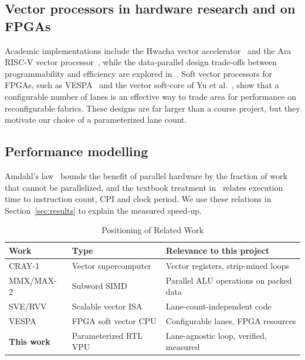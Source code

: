 \documentclass[conference]{IEEEtran}
\begin{document}
\subsection{Vector processors in hardware research and on FPGAs}
Academic implementations include the Hwacha vector accelerator~\cite{hwacha2014} and the Ara RISC-V vector processor~\cite{ara2020}, while the data-parallel design trade-offs between programmability and efficiency are explored in~\cite{lee2011}. Soft vector processors for FPGAs, such as VESPA~\cite{vespa2008} and the vector soft-core of Yu et al.~\cite{yu2008}, show that a configurable number of lanes is an effective way to trade area for performance on reconfigurable fabrics. These designs are far larger than a course project, but they motivate our choice of a parameterized lane count.

\subsection{Performance modelling}
Amdahl's law~\cite{amdahl1967} bounds the benefit of parallel hardware by the fraction of work that cannot be parallelized, and the textbook treatment in~\cite{hennessy2017,patterson2020} relates execution time to instruction count, CPI and clock period. We use these relations in Section~\ref{sec:results} to explain the measured speed-up.

\begin{table}[!t]
\caption{Positioning of Related Work}
\label{tab:related}
\centering
\footnotesize
\begin{tabular}{@{}p{1.75cm} p{2.1cm} p{3.4cm}@{}}
\toprule
\textbf{Work} & \textbf{Type} & \textbf{Relevance to this project}\\
\midrule
CRAY-1~\cite{russell1978} & Vector supercomputer & Vector registers, strip-mined loops\\
MMX/MAX-2~\cite{peleg1996,lee1996} & Subword SIMD & Parallel ALU operations on packed data\\
SVE/RVV~\cite{stephens2017,rvv2021} & Scalable vector ISA & Lane-count-independent code\\
VESPA~\cite{vespa2008} & FPGA soft vector CPU & Configurable lanes, FPGA resources\\
\textbf{This work} & Parameterized RTL VPU & Lane-agnostic loop, verified, measured\\
\bottomrule
\end{tabular}
\end{table}

\end{document}
